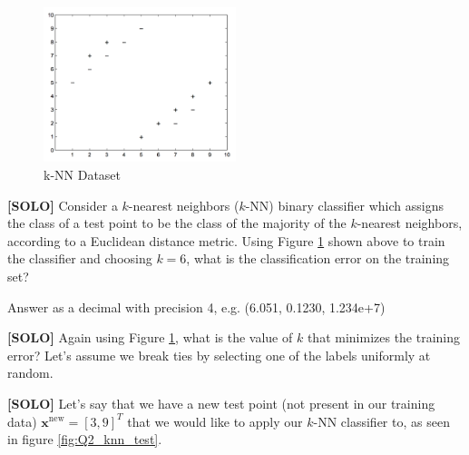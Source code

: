 \documentclass[11pt,addpoints,answers]{exam}
\newcommand{\xv}{\mathbf{x}}
\begin{document}
\begin{questions}
    
    \begin{figure}[H]
        \centering
        \includegraphics[width = 0.5\textwidth]{images/Q2_knn.png}
        \caption{k-NN Dataset \label{fig:Q2_knn}}
    \end{figure}

    \question[2] \textbf{[SOLO]} Consider a $k$-nearest neighbors ($k$-NN) binary classifier which assigns the class of a test point to be the class of the majority of the $k$-nearest neighbors, according to a Euclidean distance metric. Using Figure \ref{fig:Q2_knn} shown above to train the classifier and choosing $k=6$, what is the classification error on the training set?
    
    Answer as a decimal with precision 4, e.g. (6.051, 0.1230, 1.234e+7)
    
    \begin{your_solution}[title=Your answer:,height=2cm,width=5cm]
    \end{your_solution}
    
    
    
    

    
    
    \question[1] \textbf{[SOLO]} Again using Figure \ref{fig:Q2_knn}, what is the value of $k$ that minimizes the training error? Let’s assume we break ties by selecting one of the labels uniformly at random.
    
    \begin{your_solution}[title=Your answer:,height=2cm,width=5cm]
    \end{your_solution}

    
    
    \clearpage
    
    \question[2] \textbf{[SOLO]} Let's say that we have a new test point (not present in our training data) $\xv^{\text{new}} = [3,9]^T$ that we would like to apply our $k$-NN classifier to, as seen in figure \ref{fig:Q2_knn_test}.
    

\end{questions}
\end{document}
